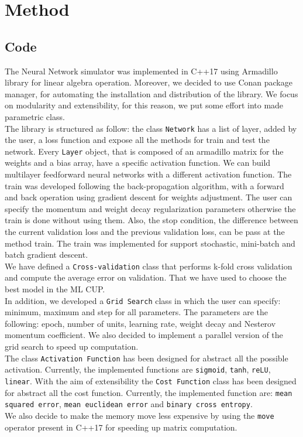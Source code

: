 \section{Method}

\subsection{Code}
The Neural Network simulator was implemented in C++17 using Armadillo library for linear algebra operation. Moreover, we decided to use Conan package manager, for automating the installation and distribution of the library. We focus on modularity and extensibility, for this reason, we put some effort into made parametric class.
\\
The library is structured as follow:
the class \texttt{Network} has a list of layer, added by the user, a loss function and expose all the methods for train and test the network. Every \texttt{Layer} object, that is composed of an armadillo matrix for the weights and a bias array, have a specific activation function. We can build  multilayer feedforward neural networks with a different activation function. The train was developed following the back-propagation algorithm, with a forward and back operation using gradient descent for weights adjustment. The user can specify the momentum and weight decay regularization parameters otherwise the train is done without using them. Also, the stop condition, the difference between the current validation loss and the previous validation loss, can be pass at the method train. The train was implemented for support stochastic, mini-batch and batch gradient descent.
\\
We have defined a \texttt{Cross-validation} class that performs k-fold cross validation and compute the average error on validation. That we have used to choose the best model in the ML CUP.
\\
In addition, we developed a \texttt{Grid Search} class in which the user can specify: minimum, maximum and step for all parameters. The parameters are the following: epoch, number of units, learning rate, weight decay and Nesterov momentum coefficient. We also decided to implement a parallel version of the grid search to speed up computation. 
\\
The class \texttt{Activation Function} has been designed for abstract all the possible activation. Currently, the implemented functions are \texttt{sigmoid}, \texttt{tanh}, \texttt{reLU}, \texttt{linear}.
With the aim of extensibility the \texttt{Cost Function} class has been designed for abstract all the cost function.
Currently, the implemented function are: \texttt{mean squared error}, \texttt{mean euclidean error} and \texttt{binary cross entropy}.
\\
We also decide to make the memory move less expensive by using the \texttt{move} operator present in C++17 for speeding up matrix computation.

